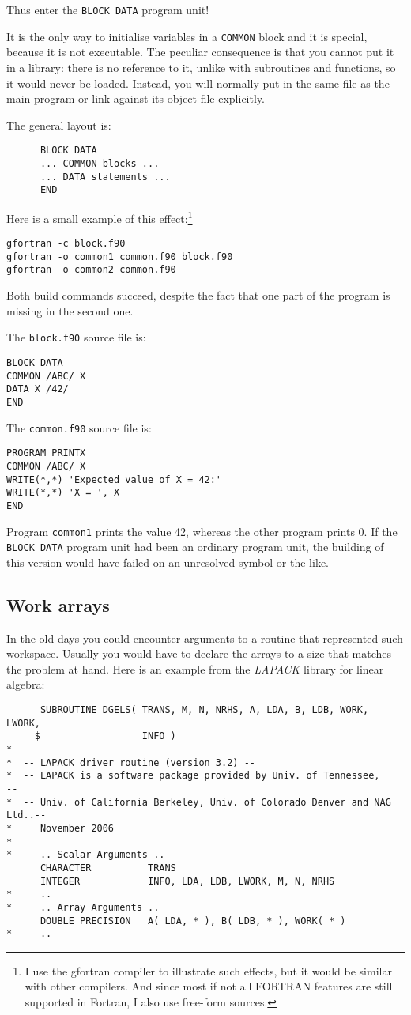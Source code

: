 Thus enter the \verb+BLOCK DATA+ program unit!

It is the only way to initialise variables in a \verb+COMMON+ block and
it is special, because it is not executable. The peculiar consequence is
that you cannot put it in a library: there is no reference to it, unlike
with subroutines and functions, so it would never be loaded. Instead, you
will normally put in the same file as the main program or link against
its object file explicitly.

The general layout is:
%
\begin{verbatim}
      BLOCK DATA
      ... COMMON blocks ...
      ... DATA statements ...
      END
\end{verbatim}

Here is a small example of this effect:\footnote{I use the gfortran compiler
to illustrate such effects, but it would be similar with other compilers.
And since most if not all FORTRAN features are still supported in Fortran,
I also use free-form sources.}
%
\begin{verbatim}
gfortran -c block.f90
gfortran -o common1 common.f90 block.f90
gfortran -o common2 common.f90
\end{verbatim}

Both build commands succeed, despite the fact that one part of the program is missing
in the second one.

The \verb+block.f90+ source file is:
%
\begin{verbatim}
BLOCK DATA
COMMON /ABC/ X
DATA X /42/
END
\end{verbatim}

The \verb+common.f90+ source file is:
%
\begin{verbatim}
PROGRAM PRINTX
COMMON /ABC/ X
WRITE(*,*) 'Expected value of X = 42:'
WRITE(*,*) 'X = ', X
END
\end{verbatim}

Program \verb+common1+ prints the value 42, whereas the other
program prints 0. If the \verb+BLOCK DATA+ program unit had been
an ordinary program unit, the building of this version would have failed
on an unresolved symbol or the like.


\subsection{Work arrays}
In the old days you could encounter arguments to a routine that represented
such workspace. Usually you would have to declare the arrays to a size that
matches the problem at hand. Here is an example from the \emph{LAPACK} library
for linear algebra:
%
\begin{verbatim}
      SUBROUTINE DGELS( TRANS, M, N, NRHS, A, LDA, B, LDB, WORK, LWORK,
     $                  INFO )
*
*  -- LAPACK driver routine (version 3.2) --
*  -- LAPACK is a software package provided by Univ. of Tennessee,    --
*  -- Univ. of California Berkeley, Univ. of Colorado Denver and NAG Ltd..--
*     November 2006
*
*     .. Scalar Arguments ..
      CHARACTER          TRANS
      INTEGER            INFO, LDA, LDB, LWORK, M, N, NRHS
*     ..
*     .. Array Arguments ..
      DOUBLE PRECISION   A( LDA, * ), B( LDB, * ), WORK( * )
*     ..
\end{verbatim}

